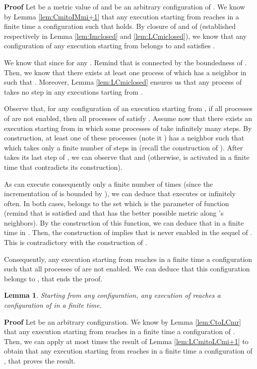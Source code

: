 \documentclass[11pt]{article}
\newenvironment{proof}{\noindent\textbf{Proof}}{\hfill\qed}
\newcommand{\qed}{\hfill}
\newtheorem{lem}{Lemma}
\newenvironment{lemma}[1]{\vspace{-0.25cm}\begin{lem}#1}{\end{lem}\vspace{-0.3cm}}
\begin{document}
\begin{proof}
Let  be a metric value of  and  be an arbitrary configuration of . We know by Lemma \ref{lem:CmitoIMmi+1} that any execution starting from  reaches in a finite time a configuration  such that  holds. By closure of  and of  (established respectively in Lemma \ref{lem:Imclosed} and \ref{lem:LCmiclosed}), we know that any configuration of any execution starting from  belongs to  and satisfies .

We know that  since  for any . Remind that  is connected by the boundedness of . Then, we know that there exists at least one process  of  which has a neighbor  in  such that . Moreover, Lemma \ref{lem:LCmiclosed} ensures us that any process of  takes no step in any executions tarting from .

Observe that, for any configuration of an execution starting from , if all processes of  are not enabled, then all processes  of  satisfy . Assume now that there exists an execution  starting from  in which some processes of  take infinitely many steps. By construction, at least one of these processes (note it ) has a neighbor  such that  which takes only a finite number of steps in  (recall the construction of ). After  takes its last step of , we can observe that  and  (otherwise,  is activated in a finite time that contradicts its construction). 

As  can execute consequently  only a finite number of times (since the incrementation of  is bounded by ), we can deduce that  executes  or  infinitely often. In both cases,  belongs to the set which is the parameter of function  (remind that  is satisfied and that  has the better possible metric along 's neighbors). By the construction of this function, we can deduce that  in a finite time in . Then, the construction of  implies that  is never enabled in the sequel of . This is contradictory with the construction of .

Consequently, any execution starting from  reaches in a finite time a configuration such that all processes of  are not enabled. We can deduce that this configuration belongs to , that ends the proof.
\end{proof}

\begin{lemma}\label{lem:convergenceLCMax}
Starting from any configuration, any execution of  reaches a configuration of  in a finite time.
\end{lemma}

\begin{proof}
Let  be an arbitrary configuration. We know by Lemma \ref{lem:CtoLCmr} that any execution starting from  reaches in a finite time a configuration of . Then, we can apply at most  times the result of Lemma \ref{lem:LCmitoLCmi+1} to obtain that any execution starting from  reaches in a finite time a configuration of , that proves the result.
\end{proof}
\end{document}
